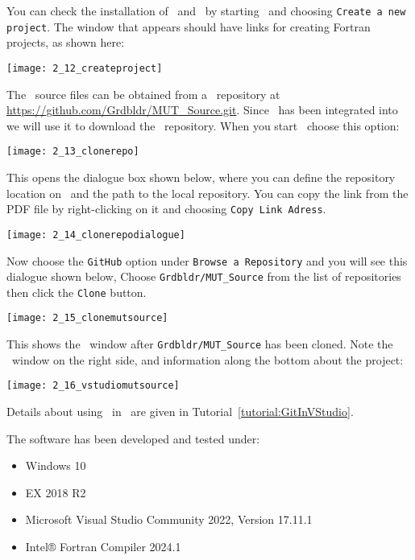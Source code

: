 You can check the installation of \vstudio\ and \ifort\ by starting \vstudio\ and choosing \texttt{Create a new project}.  The window that appears should have  links for creating Fortran projects, as shown here:

\texttt{[image: 2\_12\_createproject]}

The \mut\ source files can be obtained from a \github\ repository at \url{https://github.com/Grdbldr/MUT_Source.git}.  Since \github\ has been integrated into \vstudio\, we will use it to download the \mut\ repository.  When you start \vstudio\, choose this option:

\texttt{[image: 2\_13\_clonerepo]}

This opens the dialogue box shown below, where you can define the repository location on \github\ and the path to the local repository.  You can copy the link from the PDF file by right-clicking on it and choosing \texttt{Copy Link Adress}.

\texttt{[image: 2\_14\_clonerepodialogue]}

Now choose the \texttt{GitHub} option under \texttt{Browse a Repository} and you will see this dialogue shown below, Choose \texttt{Grdbldr/MUT\_Source} from the list of repositories then click the \texttt{Clone} button.

  \texttt{[image: 2\_15\_clonemutsource]}

This shows the \vstudio\ window after \texttt{Grdbldr/MUT\_Source} has been cloned. Note the \github\ window on the right side, and information along the bottom about the project:

    \texttt{[image: 2\_16\_vstudiomutsource]}

Details about using \github\ in \vstudio\ are given in Tutorial~\ref{tutorial:GitInVStudio}.

The software has been developed and tested under:
\begin{itemize}
    \item Windows 10
    \item {} EX 2018 R2
    \item Microsoft Visual Studio Community 2022, Version 17.11.1
    \item Intel® Fortran Compiler   2024.1
\end{itemize} 